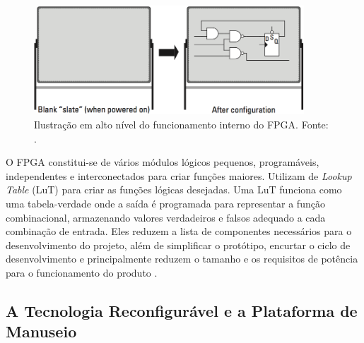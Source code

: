     \begin{figure}[h] \centering
        \includegraphics[width=0.9\textwidth]{img/rt-board.png}
        \caption{Ilustração em alto nível do funcionamento interno do FPGA. Fonte: \citet{Sass2010}.}
        \label{fig:rt-board}
    \end{figure}
    
    O FPGA constitui-se de vários módulos lógicos pequenos, programáveis, independentes e interconectados para criar funções maiores.
    Utilizam de \textit{Lookup Table} (LuT) para criar as funções lógicas desejadas.
    Uma LuT funciona como uma tabela-verdade onde a saída é programada para representar a função combinacional, armazenando valores verdadeiros e falsos adequado a cada combinação de entrada.
    Eles reduzem a lista de componentes necessários para o desenvolvimento do projeto, além de simplificar o protótipo, encurtar o ciclo de desenvolvimento e principalmente reduzem o tamanho e os requisitos de potência para o funcionamento do produto \cite{tocci2003sistemas}.
    
    
    
    \subsection{A Tecnologia Reconfigurável e a Plataforma de Manuseio}
    
